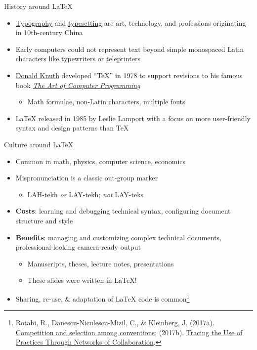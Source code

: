 \documentclass{cubeamer}
\begin{document}
\begin{frame}{History around \LaTeX}
    \begin{itemize}
        \item \href{https://en.wikipedia.org/wiki/Typography}{Typography} and \href{https://en.wikipedia.org/wiki/Typesetting}{typesetting} are art, technology, and professions originating in 10th-century China
        \item Early computers could not represent text beyond simple monospaced Latin characters like \href{https://en.wikipedia.org/wiki/Typewriter}{typewriters} or \href{https://en.wikipedia.org/wiki/Teleprinter}{teleprinters}
        \item \href{https://en.wikipedia.org/wiki/Donald_Knuth}{Donald Knuth} developed ``TeX'' in 1978 to support revisions to his famous book \href{https://en.wikipedia.org/wiki/The_Art_of_Computer_Programming}{\textit{The Art of Computer Programming}}
        \begin{itemize}
            \item Math formulae, non-Latin characters, multiple fonts
        \end{itemize}
        \item \LaTeX{} released in 1985 by Leslie Lamport with a focus on more user-friendly syntax and design patterns than TeX
    \end{itemize}
\end{frame}

\begin{frame}{Culture around \LaTeX}
    \begin{itemize}
        \item Common in math, physics, computer science, economics
        \item Mispronunciation is a classic out-group marker
        \begin{itemize}
            \item  LAH-tekh \textit{or} LAY-tekh; \textit{not} LAY-teks
        \end{itemize}
        \item \textbf{Costs}: learning and debugging technical syntax, configuring document structure and style
        \item \textbf{Benefits}: managing and customizing complex technical documents, professional-looking camera-ready output
        \begin{itemize}
            \item Manuscripts, theses, lecture notes, presentations
            \item These slides were written in \LaTeX!
        \end{itemize}
        \item Sharing, re-use, \& adaptation of \LaTeX{} code is common\footnote{Rotabi, R., Danescu-Niculescu-Mizil, C., \& Kleinberg, J. (2017a). \href{https://dl.acm.org/doi/abs/10.1145/3038912.3052652}{Competition and selection among conventions}; (2017b). \href{https://ojs.aaai.org/index.php/ICWSM/article/view/14870}{Tracing the Use of Practices Through Networks of Collaboration}.}
    \end{itemize}
\end{frame}
\end{document}
